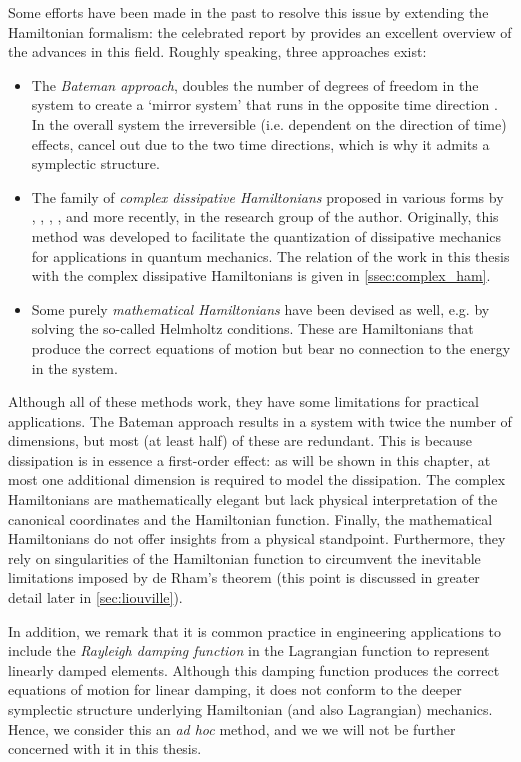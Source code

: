 Some efforts have been made in the past to resolve this issue by extending the Hamiltonian formalism: the celebrated report by \citet{Dekker1981} provides an excellent overview of the advances in this field. Roughly speaking, three approaches exist:
\begin{itemize}
    \item The \emph{Bateman approach}, doubles the number of degrees of freedom in the system to create a `mirror system' that runs in the opposite time direction \cite{Bateman1931}. In the overall system the irreversible (i.e. dependent on the direction of time) effects, cancel out due to the two time directions, which is why it admits a symplectic structure.
    \item The family of \emph{complex dissipative Hamiltonians} proposed in various forms by \citet{Bopp1974}, \citet{Dekker1975}, \citet{Dedene1980}, \citet{Rajeev2007}, and more recently, \citet{Hutters2020} in the research group of the author. Originally, this method was developed to facilitate the quantization of dissipative mechanics for applications in quantum mechanics. The relation of the work in this thesis with the complex dissipative Hamiltonians is given in \cref{ssec:complex_ham}.
    \item Some purely \emph{mathematical Hamiltonians} have been devised as well, e.g. by \citet{Havas1957} solving the so-called Helmholtz conditions. These are Hamiltonians that produce the correct equations of motion but bear no connection to the energy in the system.
\end{itemize}
Although all of these methods work, they have some limitations for practical applications. The Bateman approach results in a system with twice the number of dimensions, but most (at least half) of these are redundant. This is because dissipation is in essence a first-order effect: as will be shown in this chapter, at most one additional dimension is required to model the dissipation. The complex Hamiltonians are mathematically elegant but lack physical interpretation of the canonical  coordinates and the Hamiltonian function. Finally, the mathematical Hamiltonians do not offer insights from a physical standpoint. Furthermore, they rely on singularities of the Hamiltonian function to circumvent the inevitable limitations imposed by de Rham's theorem (this point is discussed in greater detail later in \cref{sec:liouville}).

In addition, we remark that it is common practice in engineering applications to include the \emph{Rayleigh damping function} in the Lagrangian function \cite{Goldstein2011} to represent linearly damped elements. Although this damping function produces the correct equations of motion for linear damping, it does not conform to the deeper symplectic structure underlying Hamiltonian (and also Lagrangian) mechanics. Hence, we consider this an \emph{ad hoc} method, and we we will not be further concerned with it in this thesis.

